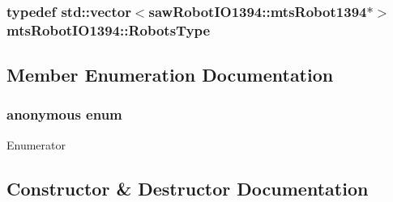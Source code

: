 \subsubsection[{Robots\+Type}]{\setlength{\rightskip}{0pt plus 5cm}typedef std\+::vector$<$saw\+Robot\+I\+O1394\+::mts\+Robot1394$\ast$$>$ {\bf mts\+Robot\+I\+O1394\+::\+Robots\+Type}\hspace{0.3cm}{\ttfamily [protected]}}\label{classmts_robot_i_o1394_ab8da6d2d438f82df01169c5bd528c9b3}


\subsection{Member Enumeration Documentation}
\hypertarget{classmts_robot_i_o1394_ab5384b5b8420c5f6c51cca571de64e71}{}\subsubsection[{anonymous enum}]{\setlength{\rightskip}{0pt plus 5cm}anonymous enum}\label{classmts_robot_i_o1394_ab5384b5b8420c5f6c51cca571de64e71}
\begin{Desc}
\item[Enumerator]\par
\begin{description}
\item[{\em 
\hypertarget{classmts_robot_i_o1394_ab5384b5b8420c5f6c51cca571de64e71ae14ba9547603419cc36292983705a60d}{}M\+A\+X\+\_\+\+B\+O\+A\+R\+D\+S\label{classmts_robot_i_o1394_ab5384b5b8420c5f6c51cca571de64e71ae14ba9547603419cc36292983705a60d}
}]\end{description}
\end{Desc}


\subsection{Constructor \& Destructor Documentation}
\hypertarget{classmts_robot_i_o1394_aee827574818e204a24ae21a0604a2547}{}

